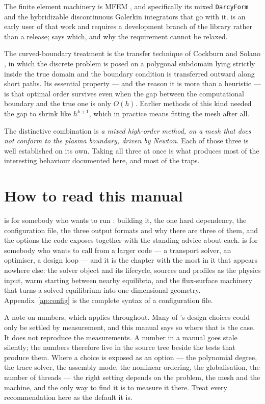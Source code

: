 The finite element machinery is MFEM \cite{Anderson2021}, and specifically its
mixed \texttt{DarcyForm} and the hybridizable discontinuous Galerkin integrators
that go with it. {\meq} is an early user of that work and requires a development
branch of the library rather than a release;  says which, and
why the requirement cannot be relaxed.

The curved-boundary treatment is the transfer technique of Cockburn and Solano
\cite{CockburnSolano2012}, in which the discrete problem is posed on a polygonal
subdomain lying strictly inside the true domain and the boundary condition is
transferred outward along short paths. Its essential property --- and the reason
it is more than a heuristic --- is that optimal order survives even when the gap
between the computational boundary and the true one is only $O(h)$. Earlier
methods of this kind needed the gap to shrink like $h^{k+1}$, which in practice
means fitting the mesh after all.

The distinctive combination is \emph{a mixed high-order method, on a mesh that
does not conform to the plasma boundary, driven by Newton}. Each of those three
is well established on its own. Taking all three at once is what produces most
of the interesting behaviour documented here, and most of the traps.

\section{How to read this manual}

 is for somebody who wants to run {\meq}: building it, the one
hard dependency, the configuration file, the three output formats and why there
are three of them, and the options the code exposes together with the standing
advice about each.  is for somebody who wants to call
{\meq} from a larger code --- a transport solver, an optimiser, a design loop
--- and it is the chapter with the most in it that appears nowhere else: the
solver object and its lifecycle, sources and profiles as the physics input, warm
starting between nearby equilibria, and the flux-surface machinery that turns a
solved equilibrium into one-dimensional geometry. Appendix~\ref{ap:config} is
the complete syntax of a configuration file.

A note on numbers, which applies throughout. Many of {\meq}'s design choices
could only be settled by measurement, and this manual says so where that is the
case. It does not reproduce the measurements. A number in a manual goes stale
silently; the numbers therefore live in the source tree beside the tests that
produce them. Where a choice is exposed as an option --- the polynomial degree,
the trace solver, the assembly mode, the nonlinear ordering, the globalisation,
the number of threads --- the right setting depends on the problem, the mesh and
the machine, and the only way to find it is to measure it there. Treat every
recommendation here as the default it is.

